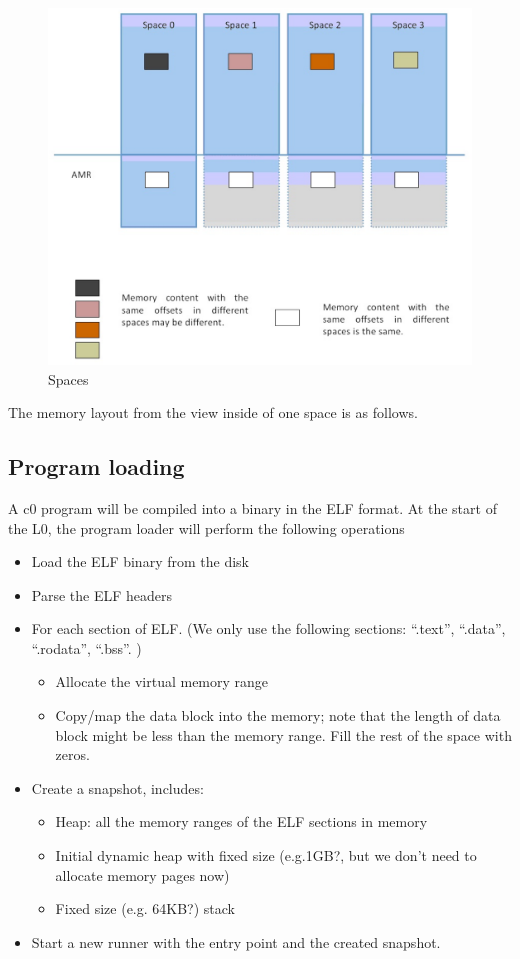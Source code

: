 \documentclass[a4paper]{article}
\begin{document}
\begin{figure}[htbp]
\begin{center}
  \includegraphics[width=5.8in]{figure/spaces.eps}
  \caption{Spaces}
  \label{fig:c0-spaces}
\end{center}
\end{figure}

The memory layout from the view inside of one space is as follows.

\subsection{Program loading}
A c0 program will be compiled into a binary in the ELF format. 
At the start of the L0, the program loader will perform the following operations

\begin{itemize}
	\item Load the ELF binary from the disk
	\item Parse the ELF headers
	\item For each section of ELF. (We only use the following sections: “.text”, “.data”, “.rodata”, “.bss”. )
		\begin{itemize}
			\item Allocate the virtual memory range 
			\item Copy/map the data block into the memory; note that the length of data block might be less than the memory range. Fill the rest of the space with zeros.
		\end{itemize}
	\item Create a snapshot, includes:
		\begin{itemize}
			\item Heap: all the memory ranges of the ELF sections in memory
			\item Initial dynamic heap with fixed size (e.g.1GB?, but we don’t need to allocate memory pages now)
			\item Fixed size (e.g. 64KB?) stack
		\end{itemize}
	\item Start a new runner with the entry point and the created snapshot.
\end{itemize}
\end{document}
